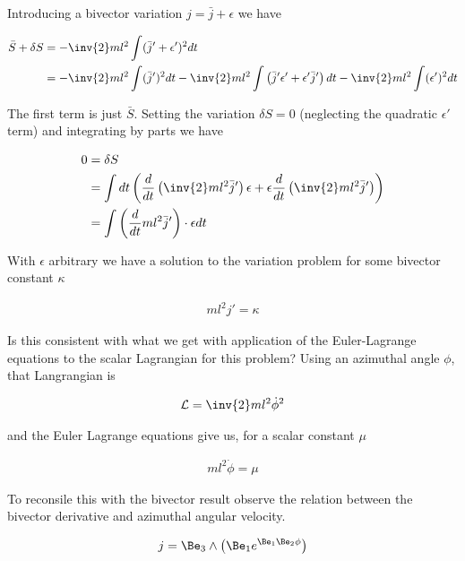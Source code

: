 Introducing a bivector variation $j = \bar{j} + \epsilon$ we have

\begin{align*}
\bar{S} + \delta S 
&= 
-\inv{2} m l^2 \int (\bar{j}' + \epsilon')^2 dt \\
&= 
-\inv{2} m l^2 \int (\bar{j}')^2 dt
-\inv{2} m l^2 \int \left( {\bar{j}}' \epsilon' + \epsilon' {\bar{j}}' \right) dt
-\inv{2} m l^2 \int (\epsilon')^2 dt
\end{align*}

The first term is just $\bar{S}$.  Setting the variation $\delta S = 0$ (neglecting the quadratic $\epsilon'$ term) and integrating by parts we have

\begin{align*}
0 &= \delta S \\
&= 
\int dt \left( \frac{d}{dt}\left( \inv{2} m l^2 {\bar{j}}' \right) \epsilon + \epsilon \frac{d}{dt}\left( \inv{2} m l^2 {\bar{j}}' \right) \right) \\
&= 
\int \left( \frac{d}{dt} m l^2 {\bar{j}}' \right) \cdot \epsilon dt 
\end{align*}

With $\epsilon$ arbitrary we have a solution to the variation problem for some bivector constant $\kappa$

\begin{align}\label{eqn:sPolarMultiPendulum:noo3}
m l^2 j' = \kappa
\end{align}

Is this consistent with what we get with application of the Euler-Lagrange equations to the scalar Lagrangian for this problem?  Using an azimuthal angle $\phi$, that Langrangian is

\begin{align}\label{eqn:sPolarMultiPendulum:noo4}
\LL = \inv{2} m l^2 \dot{\phi}^2
\end{align}

and the Euler Lagrange equations give us, for a scalar constant $\mu$

\begin{align}\label{eqn:sPolarMultiPendulum:noo5}
m l^2 \dot{\phi} = \mu
\end{align}

To reconsile this with the bivector result observe the relation between the bivector derivative and azimuthal angular velocity.

\begin{align*}
j &= \Be_3 \wedge \left(\Be_1 e^{\Be_1 \Be_2 \phi} \right) \\
\end{align*}

